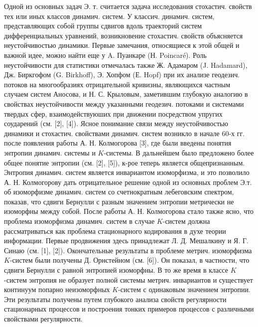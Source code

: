 \documentclass[10pt]{article}
\begin{document}
Одной из основных задач Э. т. считается задача исследования стохастич. свойств тех или иных классов динамич. систем. У классич. динамич. систем, представляющих собой группы сдвигов вдоль траекторий систем дифференциальных уравнений, возникновение стохастич. свойств объясняется неустойчивостью динамики. Первые замечания, относящиеся к этой общей и важной идее, можно найти еще у A. Пуанкаре (Н. Poincaré). Роль неустойчивости для статистики отмечалась также Ж. Адамаром (J. Hadamard), Дж. Биркгофом (G. Birkhoff), Э. Хопфом (Е. Hopf) при их анализе геодезич. потоков на многообразиях отрицательной кривизны, являющихся частным случаем систем Аносова, и Н. С. Крыловым, заметившим глубокую аналогию в свойствах неустойчивости между указанными геодезич. потоками и системами твердых сфер, взаимодействуюших при движении посредством упругих соударений (см. [2], [4]). Ясное понимание связи между неустойчивостью динамики и стохастич. свойствами динамич. систем возникло в начале 60-х гг. после появления работы А. Н. Колмогорова [3], где были введены понятия энтропии динамич. системы и $K$-системы. В дальнейшем было предложено более общее понятие энтропии (см. [2], [5]), к-рое теперь является общепризнанным. Энтропия динамич. систем является инвариантом изоморфизма, и это позволило А. Н. Колмогорову дать отрицательное решение одной из основных проблем Э.т. об изоморфизме динамич. систем со счетнократным лебеговским спектром, показав, что сдвиги Бернулли с разным значением энтропии метрически не изоморфны между собой. После работы А. Н. Колмогорова стало также ясно, что проблема изоморфизма динамич. систем в случае $K$-систем должна рассматриваться как проблема стационарного кодирования в духе теории информации. Первые продвижения здесь принадлежат Л. Д. Мешалкину и Я. Г. Синаю (см. [1], [2]). Окончательные результаты в проблеме метрич. изоморфизма $K$-систем были получены Д. Орнстейном (см. [6]). Он показал, в частности, что сдвиги Бернулли с равной энтропией изоморфны. В то же время в классе $K$-систем энтропия не образует полной системы метрич. инвариантов и существует континуум попарно неизоморфных $K$-систем с одинаковым значением энтропии. Эти результаты получены путем глубокого анализа свойств регулярности стационарных процессов и построения тонких примеров процессов с различными свойствами регулярности.
\end{document}
